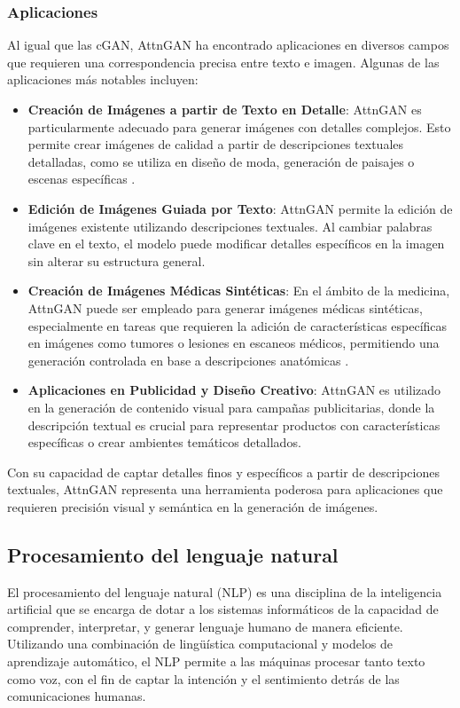 \subsubsection{Aplicaciones}
Al igual que las cGAN, AttnGAN ha encontrado aplicaciones en diversos campos que requieren una correspondencia precisa entre texto e imagen. Algunas de las aplicaciones más notables incluyen:
\begin{itemize} 
    \item \textbf{Creación de Imágenes a partir de Texto en Detalle}: AttnGAN es particularmente adecuado para generar imágenes con detalles complejos. Esto permite crear imágenes de calidad a partir de descripciones textuales detalladas, como se utiliza en diseño de moda, generación de paisajes o escenas específicas \cite{xu2018attngan}.
    \item \textbf{Edición de Imágenes Guiada por Texto}: AttnGAN permite la edición de imágenes existente utilizando descripciones textuales. Al cambiar palabras clave en el texto, el modelo puede modificar detalles específicos en la imagen sin alterar su estructura general.
    \item \textbf{Creación de Imágenes Médicas Sintéticas}: En el ámbito de la medicina, AttnGAN puede ser empleado para generar imágenes médicas sintéticas, especialmente en tareas que requieren la adición de características específicas en imágenes como tumores o lesiones en escaneos médicos, permitiendo una generación controlada en base a descripciones anatómicas \cite{ARMANIOUS2020101684}.
    \item \textbf{Aplicaciones en Publicidad y Diseño Creativo}: AttnGAN es utilizado en la generación de contenido visual para campañas publicitarias, donde la descripción textual es crucial para representar productos con características específicas o crear ambientes temáticos detallados.
\end{itemize}

Con su capacidad de captar detalles finos y específicos a partir de descripciones textuales, AttnGAN representa una herramienta poderosa para aplicaciones que requieren precisión visual y semántica en la generación de imágenes.


\subsection{Procesamiento del lenguaje natural}
El procesamiento del lenguaje natural (NLP) es una disciplina de la inteligencia artificial que se encarga de dotar a los sistemas informáticos de la capacidad de comprender, interpretar, y generar lenguaje humano de manera eficiente. Utilizando una combinación de lingüística computacional y modelos de aprendizaje automático, el NLP permite a las máquinas procesar tanto texto como voz, con el fin de captar la intención y el sentimiento detrás de las comunicaciones humanas.

